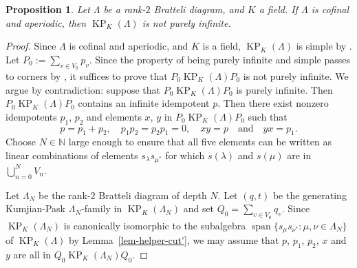 \documentclass[a4paper,12pt]{amsart}
\numberwithin{equation}{section}
\newtheorem{prop}[thm]{Proposition}
\theoremstyle{definition}
\theoremstyle{remark}
\begin{document}
\begin{prop}\label{prop-notpi}
Let $\Lambda$ be a rank-$2$ Bratteli diagram, and  $K$ a field. If $\Lambda$ is cofinal and aperiodic, then $\operatorname{KP}_K(\Lambda)$ is not purely infinite. 
\end{prop}

\begin{proof} Since $\Lambda$ is cofinal and aperiodic, and $K$ is a field, $\operatorname{KP}_K(\Lambda)$ is simple by \cite[Theorem~6.1]{ACaHR}.
Let $P_0:=\sum_{v\in V_0}p_v$.  Since the property of being purely infinite and simple 
passes to corners by \cite[Proposition~10]{AA2}, it suffices  to prove that $P_0\operatorname{KP}_K(\Lambda)P_0$ is not purely infinite. We argue by contradiction: suppose that $P_0\operatorname{KP}_K(\Lambda)P_0$ is purely infinite.
Then $P_0\operatorname{KP}_K(\Lambda)P_0$ contains an infinite idempotent $p$. Then there exist nonzero idempotents  $p_1$, $p_2$ and elements $x$, $y$ in $P_0\operatorname{KP}_K(\Lambda)P_0$ such that
\begin{equation}\label{infinrels}
p=p_1+p_2,\quad p_1p_2=p_2p_1=0,\quad xy=p\quad \text{and}\quad yx=p_1.
\end{equation}
Choose $N\in {\mathbb{N}}$ large enough to ensure that all five elements can be written as linear combinations of elements $s_\lambda s_{\mu^*}$ for which $s(\lambda)$ and $s(\mu)$ are in $\bigcup_{n=0}^N V_n$. 

Let $\Lambda_N$ be the rank-$2$ Bratteli diagram of depth $N$. Let $(q,t)$ be the generating Kumjian-Pask $\Lambda_N$-family in $\operatorname{KP}_K(\Lambda_N)$ and set $Q_0=\sum_{v\in V_0}q_v$.  Since $\operatorname{KP}_K(\Lambda_N)$ is canonically isomorphic to the subalgebra ${\operatorname{\mathrm{span}}}\{s_\mu s_{\nu^*}:\mu,\nu\in\Lambda_N\}$ of $\operatorname{KP}_K(\Lambda)$ by Lemma~\ref{lem-helper-cut'}, we may assume that $p$, $p_1$, $p_2$, $x$ and $y$ are all in $Q_0\operatorname{KP}_K(\Lambda_N)Q_0$.


\end{proof}
\end{document}
